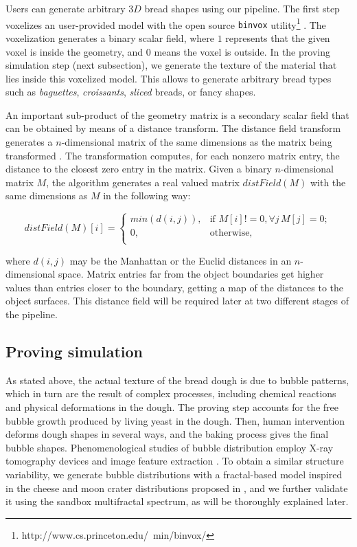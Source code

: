 \documentclass[spanish,a4paper,11pt,oneside,links]{report}
\begin{document}
Users can generate arbitrary $3D$ bread shapes using our pipeline.
The first step voxelizes an user-provided model with the open source {\tt binvox} utility\footnote{http://www.cs.princeton.edu/~min/binvox/} \cite{Nooruddin2003}.
The voxelization generates a binary scalar field, where $1$ represents that the given voxel is inside the geometry, and $0$ means the voxel is outside.
In the proving simulation step (next subsection), we generate the texture of the material that lies inside this voxelized model.
This allows to generate arbitrary bread types such as {\em baguettes}, {\em croissants}, {\em sliced} breads, or fancy shapes.

An important sub-product of the geometry matrix is a secondary scalar field that can be obtained by means of a distance transform.
The distance field transform generates a $n$-dimensional matrix of the same dimensions as the matrix being transformed \cite{osh03}. 
The transformation computes, for each nonzero matrix entry, the distance to the closest zero entry in the matrix.
Given a binary $n$-dimensional matrix $M$, the algorithm generates a real valued matrix $distField(M)$ with the same dimensions as $M$ in the following way:

\[
distField(M)[i] =
\begin{cases}
min(d(i,j)), & \text{if } M[i] != 0, \forall j \, M[j] = 0;\\
0, & \text{otherwise, }\\
\end{cases}
\]


\noindent
where $d(i,j)$ may be the Manhattan or the Euclid distances in an $n$-dimensional space. 
Matrix entries far from the object boundaries get higher values than entries closer to the boundary, getting a map of the distances to the object surfaces. 
This distance field will be required later at two different stages of the pipeline.

\subsection{Proving simulation}
\label{breadprov}

As stated above, the actual texture of the bread dough is due to bubble patterns, which in turn are the result of complex processes, including chemical reactions and physical deformations in the dough.
The proving step accounts for the free bubble growth produced by living yeast in the dough.
Then, human intervention deforms dough shapes in several ways, and the baking process gives the final bubble shapes.
Phenomenological studies of bubble distribution employ X-ray tomography devices and image feature extraction \cite{Babin2006,Gonzales2008,VanDyck2014}.
To obtain a similar structure variability, we generate bubble distributions with a fractal-based model inspired in the cheese and moon crater distributions proposed in \cite{Mandelbrot1982}, and we further validate it using the sandbox multifractal spectrum, as will be thoroughly explained later.
\end{document}
